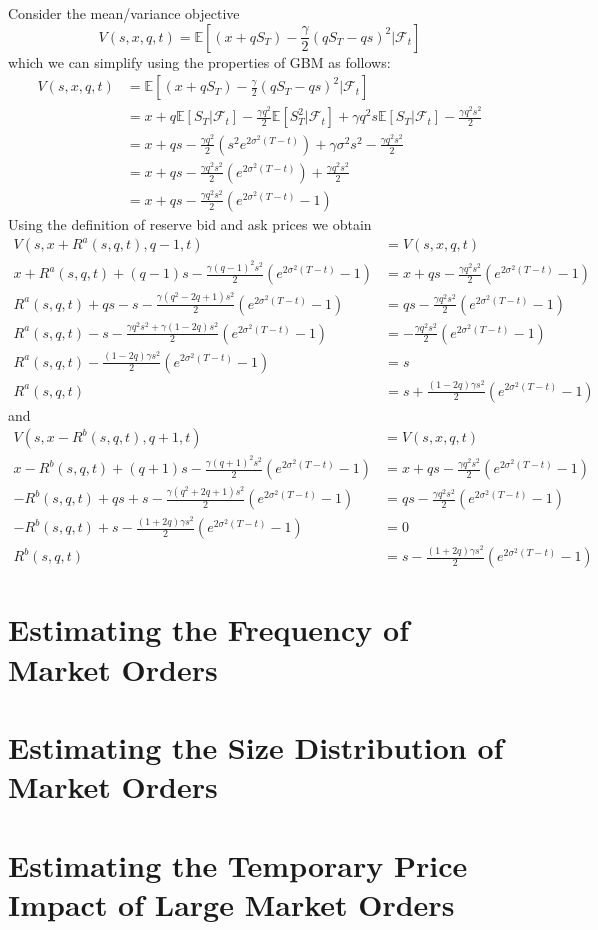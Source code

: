 Consider the mean/variance objective
\begin{equation}
    V(s,x,q,t)=\mathbb{E}\left[(x+qS_T)-\frac{\gamma}{2}(qS_T-qs)^2|\mathcal{F}_t\right]
\end{equation}
which we can simplify using the properties of GBM as follows:
\begin{align*}
    V(s,x,q,t)&=\mathbb{E}\left[(x+qS_T)-\frac{\gamma}{2}(qS_T-qs)^2|\mathcal{F}_t\right]\\
    &=x+q\mathbb{E}[S_T|\mathcal{F}_t]-\frac{\gamma q^2}{2}\mathbb{E}[S_T^2|\mathcal{F}_t]+\gamma q^2s\mathbb{E}[S_T|\mathcal{F}_t]-\frac{\gamma q^2s^2}{2}\\
    &=x+qs-\frac{\gamma q^2}{2}\left(s^2e^{2\sigma^2(T-t)}\right)+\gamma\sigma^2s^2-\frac{\gamma q^2s^2}{2}\\
    &=x+qs-\frac{\gamma q^2s^2}{2}\left(e^{2\sigma^2(T-t)}\right)+\frac{\gamma q^2s^2}{2}\\
    &=x+qs-\frac{\gamma q^2s^2}{2}\left(e^{2\sigma^2(T-t)}-1\right)
\end{align*}
Using the definition of reserve bid and ask prices we obtain
\begin{align*}
    V(s,x+R^a(s,q,t),q-1,t)&=V(s,x,q,t)\\
    x+R^a(s,q,t)+(q-1)s-\frac{\gamma (q-1)^2s^2}{2}\left(e^{2\sigma^2(T-t)}-1\right)&=x+qs-\frac{\gamma q^2s^2}{2}\left(e^{2\sigma^2(T-t)}-1\right)\\
    R^a(s,q,t)+qs-s-\frac{\gamma (q^2-2q+1)s^2}{2}\left(e^{2\sigma^2(T-t)}-1\right)&=qs-\frac{\gamma q^2s^2}{2}\left(e^{2\sigma^2(T-t)}-1\right)\\
    R^a(s,q,t)-s-\frac{\gamma q^2s^2+\gamma(1-2q)s^2}{2}\left(e^{2\sigma^2(T-t)}-1\right)&=-\frac{\gamma q^2s^2}{2}\left(e^{2\sigma^2(T-t)}-1\right)\\
    R^a(s,q,t)-\frac{(1-2q)\gamma s^2}{2}\left(e^{2\sigma^2(T-t)}-1\right)&=s\\
    R^a(s,q,t)&=s+ \frac{(1-2q)\gamma s^2}{2}\left(e^{2\sigma^2(T-t)}-1\right)
\end{align*}
and
\begin{align*}
    V(s,x-R^b(s,q,t),q+1,t)&=V(s,x,q,t)\\
    x-R^b(s,q,t)+(q+1)s-\frac{\gamma (q+1)^2s^2}{2}\left(e^{2\sigma^2(T-t)}-1\right)&=x+qs-\frac{\gamma q^2s^2}{2}\left(e^{2\sigma^2(T-t)}-1\right)\\
    -R^b(s,q,t)+qs+s-\frac{\gamma (q^2+2q+1)s^2}{2}\left(e^{2\sigma^2(T-t)}-1\right)&=qs-\frac{\gamma q^2s^2}{2}\left(e^{2\sigma^2(T-t)}-1\right)\\
    -R^b(s,q,t)+s-\frac{(1+2q)\gamma s^2}{2}\left(e^{2\sigma^2(T-t)}-1\right)&=0\\
    R^b(s,q,t)&=s- \frac{(1+2q)\gamma s^2}{2}\left(e^{2\sigma^2(T-t)}-1\right)
\end{align*}
\section{Estimating the Frequency of Market Orders}
\section{Estimating the Size Distribution of Market Orders}
\section{Estimating the Temporary Price Impact of Large Market Orders}